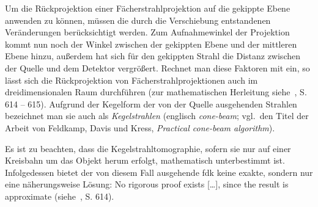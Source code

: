 Um die Rückprojektion einer Fächerstrahlprojektion auf die gekippte Ebene anwenden zu können, müssen die durch die
Verschiebung entstandenen Veränderungen berücksichtigt werden. Zum Aufnahmewinkel der Projektion kommt nun noch der
Winkel zwischen der gekippten Ebene und der mittleren Ebene hinzu, außerdem hat sich für den gekippten Strahl die
Distanz zwischen der Quelle und dem Detektor vergrößert. Rechnet man diese Faktoren mit ein, so lässt sich die
Rückprojektion von Fächerstrahlprojektionen auch im dreidimensionalen Raum durchführen (zur mathematischen Herleitung
siehe~\cite{fdk}, S. 614 -- 615). Aufgrund der Kegelform der von der Quelle ausgehenden Strahlen bezeichnet man sie auch
als \textit{Kegelstrahlen} (englisch \textit{cone-beam}; vgl.\ den Titel der Arbeit von Feldkamp, Davis und Kress,
\textit{Practical cone-beam algorithm}).

Es ist zu beachten, dass die Kegelstrahltomographie, sofern sie nur auf einer Kreisbahn um das Objekt herum erfolgt,
mathematisch unterbestimmt ist. Infolgedessen bietet der von diesem Fall ausgehende \gls{fdk} keine exakte, sondern
nur eine näherungsweise Lösung: {\glqq}No rigorous proof exists [\ldots], since the result is approximate{\grqq}
(siehe~\cite{fdk}, S. 614).

